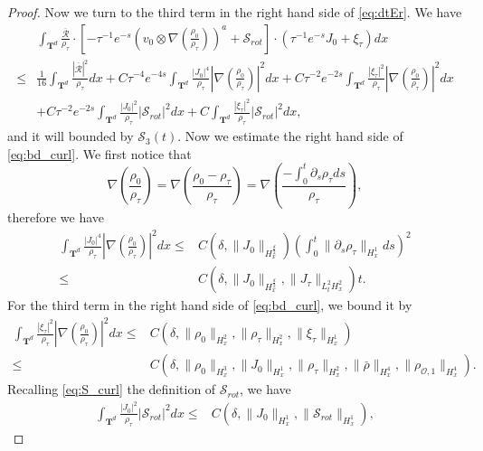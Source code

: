 \documentclass[english]{amsart}
\theoremstyle{plain}
\theoremstyle{definition}
\theoremstyle{remark}
\theoremstyle{plain}
\theoremstyle{plain}
\theoremstyle{plain}
\def\T{{\mathbf T}}%
\def\d{{\partial}}
\numberwithin{equation}{section}
\begin{document}
\begin{proof}
Now we turn to the third term in the right hand side of \eqref{eq:dtEr}. We have
\begin{equation}\label{eq:bd_curl}
\begin{aligned}
&\int_{\T^d}\frac{\overline{\mathcal{R}}}{\rho_\tau}\cdot\left[-\tau^{-1} e^{-s}\left(v_0\otimes\nabla\left(\frac{\rho_0}{\rho_\tau}\right)\right)^a+\mathcal{S}_{rot}\right]\cdot(\tau^{-1}e^{-s}J_0+\xi_\tau)dx\\
\leq & \frac{1}{16}\int_{\T^d}\frac{|\overline{\mathcal{R}}|^2}{\rho_\tau}dx+C\tau^{-4}e^{-4s}\int_{\T^d}\frac{|J_0|^4}{\rho_\tau}\left|\nabla\left(\frac{\rho_0}{\rho_\tau}\right)\right|^2dx+C\tau^{-2}e^{-2s}\int_{\T^d}\frac{|\xi_\tau|^2}{\rho_\tau}\left|\nabla\left(\frac{\rho_0}{\rho_\tau}\right)\right|^2dx\\
&+C\tau^{-2}e^{-2s}\int_{\T^d}\frac{|J_0|^2}{\rho_\tau}|\mathcal{S}_{rot}|^2dx+C\int_{\T^d}\frac{|\xi_\tau|^2}{\rho_\tau}|\mathcal{S}_{rot}|^2dx,
\end{aligned}
\end{equation}
and it will bounded by $\mathcal{S}_3(t)$. 
Now we estimate the right hand side of \eqref{eq:bd_curl}. We first notice that
\[
\nabla\left(\frac{\rho_0}{\rho_\tau}\right)=\nabla\left(\frac{\rho_0-\rho_\tau}{\rho_\tau}\right)=\nabla\left(\frac{-\int_0^t\d_s\rho_\tau ds}{\rho_\tau}\right),
\]
therefore we have
\begin{align*}
\int_{\T^d}\frac{|J_0|^4}{\rho_\tau}\left|\nabla\left(\frac{\rho_0}{\rho_\tau}\right)\right|^2dx\leq & C(\delta, \|J_0\|_{H^\frac{d}{2}_x})\left(\int_0^t\|\d_s\rho_\tau\|_{H^1_x}ds\right)^2\\
\leq & C(\delta,\|J_0\|_{H^{\frac{d}{2}}_x},\|J_\tau\|_{L^2_tH^2_x})t.
\end{align*}
For  the third term in the right hand side of \eqref{eq:bd_curl}, we bound it by
\begin{align*}
\int_{\T^d}\frac{|\xi_\tau|^2}{\rho_\tau}\left|\nabla\left(\frac{\rho_0}{\rho_\tau}\right)\right|^2dx\leq & C(\delta,\|\rho_0\|_{H^2_x},\|\rho_\tau\|_{H^2_x},\|\xi_\tau\|_{H^1_x})\\
\leq & C(\delta,\|\rho_0\|_{H^3_x},\|J_0\|_{H^1_x},\|\rho_\tau\|_{H^2_x},\|\bar\rho\|_{H^4_x},\|\rho_{\mathcal{O},1}\|_{H^4_x}).
\end{align*}
Recalling \eqref{eq:S_curl} the definition of $\mathcal{S}_{rot}$, we have
\begin{align*}
\int_{\T^d}\frac{|J_0|^2}{\rho_\tau}|\mathcal{S}_{rot}|^2dx\leq & C(\delta,\|J_0\|_{H^1_x},\|\mathcal{S}_{rot}\|_{H^1_x}),
\end{align*}

\end{proof}
\end{document}

